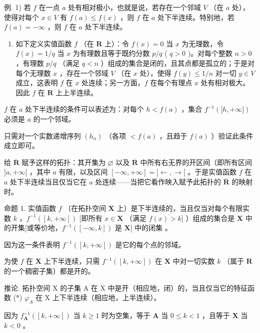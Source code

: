 例. 1) 若 \(f\) 在一点 \(a\) 处有相对极小，也就是说，若存在一个邻域 \(V\) （在 \(a\) 处），使得对每个 \(x \in V\) 有 \(f(a) \leqslant f(x)\) ，则 \(f\) 在 \(a\) 处下半连续。特别地，若 \(f(a) = -\infty\) ，则 \(f\) 在 \(a\) 处下半连续。

\begin{enumerate}
\def\labelenumi{\arabic{enumi})}
\setcounter{enumi}{1}
\tightlist
\item
  如下定义实值函数 \(f\) （在 \(\mathbf{R}\) 上）：令 \(f(x) = 0\) 当 \(x\) 为无理数，令 \(f(x) = 1 / q\) 当 \(x\) 为有理数且等于既约分数 \(p / q\) ( \(q > 0\) )。对每个整数 \(n > 0\) ，有理数 \(p / q\) （满足 \(q < n\) ）组成的集合是闭的，且其点都是孤立的；于是对每个无理数 \(x\) ，存在一个邻域 \(V\) （在 \(x\) 处），使得 \(f(y) \leqslant 1 / n\) 对一切 \(y \in V\) 成立，这表明 \(f\) 在 \(x\) 处连续；另一方面，\(f\) 在每个有理点 \(x\) 处有相对极大。因此 \(f\) 在 \(\mathbf{R}\) 上上半连续。
\end{enumerate}

\(f\) 在 \(a\) 处下半连续的条件可以表述为：对每个 \(h < f(a)\) ，集合 \(f^{-1}(]h, +\infty])\) 必须是 \(a\) 的一个邻域。

只需对一个实数递增序列 \((h_{n})\) （各项 \(<f(a)\) ，且趋于 \(f(a)\) ）验证此条件成立即可。

给 \(\overline{\mathbf{R}}\) 赋予这样的拓扑：其开集为 \(\varnothing\) 以及 \(\overline{\mathbf{R}}\) 中所有右无界的开区间（即所有区间 \(]a, +\infty[\) ，其中 \(a\) 有限，以及区间 \([- \infty, +\infty] = ] \leftarrow, \rightarrow[\) 。于是实值函数 \(f\) 在 \(a\) 处下半连续当且仅当它在 \(a\) 处连续——当把它看作映入赋予此拓扑的 \(\overline{\mathbf{R}}\) 的映射时。

命题 1. 实值函数 \(f\) （在拓扑空间 \(\mathbf{X}\) 上）是下半连续的，当且仅当对每个有限实数 \(k\) ，\(f^{-1}([k, +\infty])\) {[}即所有 \(x \in \mathbf{X}\) （满足 \(f(x) > k]\) ）组成的集合是 \(\mathbf{X}\) 中的开集{[}或等价地，\(f^{-1}([- \infty, k])\) 是 \(\mathbf{X}]\) 中的闭集 。

因为这一条件表明 \(f^{-1}([k, +\infty])\) 是它的每个点的邻域。

为使 \(f\) 在 \(\mathbf{X}\) 上下半连续，只需 \(f^{-1}([k, +\infty])\) 在 \(\mathbf{X}\) 中对一切实数 \(k\) （属于 \(\mathbf{R}\) 的一个稠密子集）都是开的。

推论. 拓扑空间 X 的子集 A 在 X 中是开（相应地，闭）的，当且仅当它的特征函数 (*) \(\varphi_{A}\) 在 X 上下半连续（相应地，上半连续）。

因为 \(f_{\mathbf{A}}^{-1}([k, +\infty])\) 当 \(k \geqslant 1\) 时为空集，等于 \(\mathbf{A}\) 当 \(0 \leqslant k < 1\) ，且等于 \(\mathbf{X}\) 当 \(k < 0\) 。

